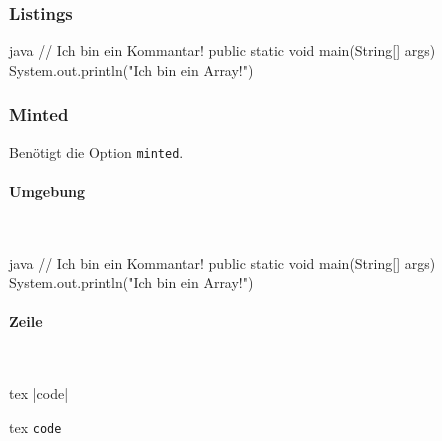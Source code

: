 \subsubsection{Listings}
\begin{listing}
\ifminted   {}
\else       {}\fi
\begin{code}[firstnumber=last]{java}
// Ich bin ein Kommantar!
public static void main(String[] args) {
    System.out.println("Ich bin ein Array!")
}
\end{code}
\ifminted   {}
\else       {}\fi
\caption{Java Lstlisting}
\label{lst:java-lstlisting}
\end{listing}

\newpage
\subsubsection{Minted}
Benötigt die Option \texttt{minted}.
\paragraph{Umgebung}~\\
\begin{listing}
\ifminted   {}
\else       {}\fi
\begin{code}[firstnumber=last]{java}
// Ich bin ein Kommantar!
public static void main(String[] args) {
    System.out.println("Ich bin ein Array!")
}
\end{code}
\ifminted   {}
\else       {}\fi
\caption{Minted Umgebung}
\label{lst:minted-env}
\end{listing}

\paragraph{Zeile}~\\
\begin{listing}
\begin{code}{tex}
|code|
\end{code}
\caption{Minted Einzeiler}
\label{lst:minted-line}
\end{listing}

\begin{listing}
\begin{code}{tex}
\texttt{code}
\end{code}
\caption{Minted Inline}
\label{lst:minted-inline}
\end{listing}